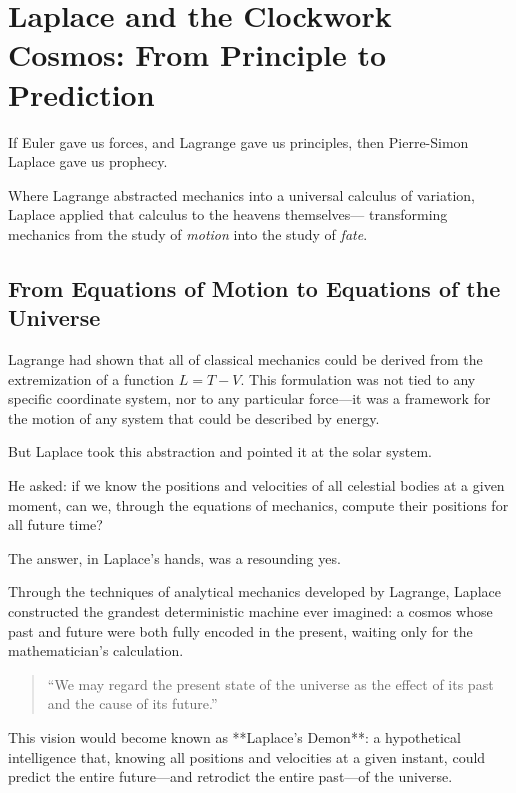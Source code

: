 \section{Laplace and the Clockwork Cosmos: From Principle to Prediction}

If Euler gave us forces, and Lagrange gave us principles, then Pierre-Simon Laplace gave us prophecy.

Where Lagrange abstracted mechanics into a universal calculus of variation,  
Laplace applied that calculus to the heavens themselves—  
transforming mechanics from the study of \emph{motion} into the study of \emph{fate}.

\bigskip

\subsection*{From Equations of Motion to Equations of the Universe}

Lagrange had shown that all of classical mechanics could be derived from the extremization of a function \( L = T - V \).  
This formulation was not tied to any specific coordinate system, nor to any particular force—it was a framework for the motion of any system that could be described by energy.

But Laplace took this abstraction and pointed it at the solar system.

He asked: if we know the positions and velocities of all celestial bodies at a given moment,  
can we, through the equations of mechanics, compute their positions for all future time?

The answer, in Laplace’s hands, was a resounding yes.

Through the techniques of analytical mechanics developed by Lagrange, Laplace constructed the grandest deterministic machine ever imagined:  
a cosmos whose past and future were both fully encoded in the present, waiting only for the mathematician’s calculation.

\bigskip

\begin{quote}
“We may regard the present state of the universe as the effect of its past and the cause of its future.”
\end{quote}

This vision would become known as **Laplace’s Demon**:  
a hypothetical intelligence that, knowing all positions and velocities at a given instant, could predict the entire future—and retrodict the entire past—of the universe.

